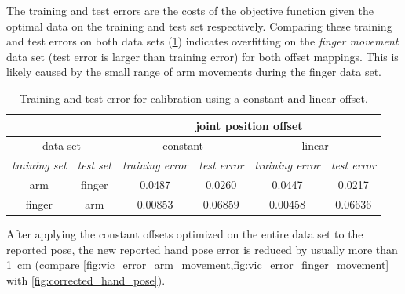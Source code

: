 The training and test errors are the costs of the objective function given the optimal data on the training and test set respectively. Comparing these training and test errors on both data sets (\cref{tab:offset_training_test_error}) indicates overfitting on the \textit{finger movement} data set (test error is larger than training error) for both offset mappings. This is likely caused by the small range of arm movements during the finger data set.


\begin{table}
\centering
\begin{tabular}{|c|c||c|c||c|c|}
\hline
\multicolumn{2}{|c||}{} & \multicolumn{4}{c|}{joint position offset} \\
\hline
\multicolumn{2}{|c||}{data set}  & \multicolumn{2}{c||}{constant} & \multicolumn{2}{c|}{linear} \\
\hline
\textit{training set} & \textit{test set} & \textit{training error} & \textit{test error} & \textit{training error} & \textit{test error} \\
\hline
arm & finger & 0.0487 & 0.0260 & 0.0447 & 0.0217 \\
\hline
finger & arm & 0.00853 & 0.06859 & 0.00458 & 0.06636 \\
\hline
\end{tabular}
\caption{Training and test error for calibration using a constant and linear offset.}
\label{tab:offset_training_test_error}
\end{table}

After applying the constant offsets optimized on the entire data set to the reported pose, the new reported hand pose error is reduced by usually more than \SI{1}{\cm} (compare \cref{fig:vic_error_arm_movement,fig:vic_error_finger_movement} with \cref{fig:corrected_hand_pose}).

